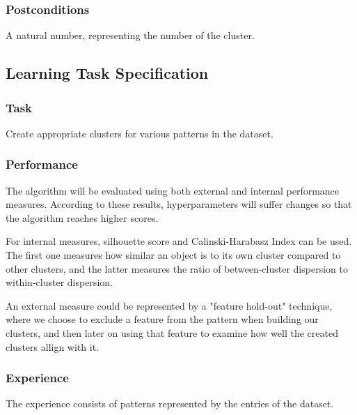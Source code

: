 \documentclass[a4paper, 11pt]{article}
\begin{document}
\subsubsection*{Postconditions} 
  A natural number, representing the number of the cluster.

\subsection{Learning Task Specification}

\subsubsection*{Task}
Create appropriate clusters for various patterns in the dataset.

\subsubsection*{Performance}
The algorithm will be evaluated using both external and internal
performance measures. According to these results, hyperparameters
will suffer changes so that the algorithm reaches higher scores.

For internal measures, silhouette score and Calinski-Harabasz Index
can be used. The first one measures how similar an object is to its own cluster
compared to other clusters, and the latter measures the ratio
of between-cluster dispersion to within-cluster dispersion.

An external measure could be represented by a "feature hold-out" technique,
where we choose to exclude a feature from the pattern when building our clusters,
and then later on using that feature to examine how well the created clusters
allign with it.

\subsubsection*{Experience}
The experience consists of patterns represented by the entries
of the dataset.
\end{document}
